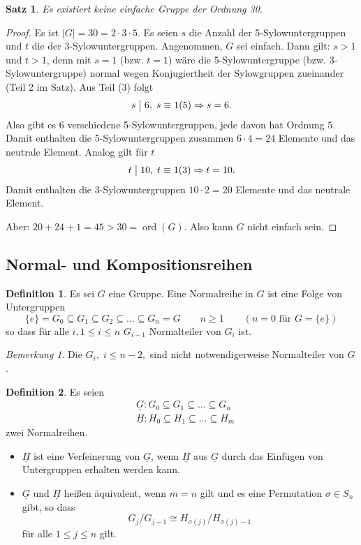 \documentclass[12pt]{scrartcl} %
\DeclareMathOperator{\ord}{ord}
\newcommand{\divides}{\mathrel{\bigm|}}
\newtheorem{thm}{Satz}
\theoremstyle{definition}
\newtheorem*{defn}{Definition}
\theoremstyle{remark}
\newtheorem*{nb}{Bemerkung}
\begin{document}
\begin{thm}
	Es existiert keine einfache Gruppe der Ordnung 30.
\end{thm}

\begin{proof}
	Es ist $|G| = 30 = 2\cdot 3\cdot 5$. Es seien $s$ die Anzahl der 5-Sylowuntergruppen und $t$ die der 3-Sylowuntergruppen. Angenommen, $G$ sei einfach. Dann gilt: $s>1$ und $t>1$, denn mit $s=1$ (bzw. $t=1$) wäre die 5-Sylowuntergruppe (bzw. 3-Sylowuntergruppe) normal wegen Konjugiertheit der Sylowgruppen zueinander (Teil 2 im Satz). Aus Teil (3) folgt
		\[ s \divides 6,\; s\equiv 1(5)\Rightarrow s=6.\]
	Also gibt es 6 verschiedene 5-Sylowuntergruppen, jede davon hat Ordnung $5$. Damit enthalten die 5-Sylowuntergruppen zusammen $6\cdot 4 =24$ Elemente und das neutrale Element. Analog gilt für $t$
		\[ t \divides 10,\; t\equiv 1(3) \Rightarrow t=10.\]
	Damit enthalten die 3-Sylowuntergruppen $10\cdot 2=20$ Elemente und das neutrale Element.
	
	Aber: $20+24+1=45>30=\ord(G)$. Also kann $G$ nicht einfach sein.
\end{proof}

\subsection{Normal- und Kompositionsreihen}

\begin{defn}
	Es sei $G$ eine Gruppe. Eine Normalreihe in $G$ ist eine Folge von Untergruppen
		\[ \{e\} = G_0 \subseteq G_1 \subseteq G_2 \subseteq\dots\subseteq G_n=G\qquad n\geq 1\qquad(n=0\text{ für } G=\{e\})\]
	so dass für alle $i,1\leq i\leq n$ $G_{i-1}$ Normalteiler von $G_i$ ist.
\end{defn}

\begin{nb}
	Die $G_i,\;i\leq n-2,$ sind nicht notwendigerweise Normalteiler von $G$.
\end{nb}

\begin{defn}
	Es seien 
		\[\begin{split}
			&\underline{G}: G_0\subseteq G_1 \subseteq\dots\subseteq G_n \\
			&\underline{H}: H_0\subseteq H_1\subseteq\dots\subseteq H_m 
		\end{split}\]
	zwei Normalreihen.
	\begin{itemize}
		\item $\underline{H}$ ist eine Verfeinerung von $\underline{G}$, wenn $\underline{H}$ aus $\underline{G}$ durch das Einfügen von Untergruppen erhalten werden kann.
		\item $\underline{G}$ und $\underline{H}$ heißen äquivalent, wenn $m=n$ gilt und es eine Permutation $\sigma\in S_n$ gibt, so dass 
		\[ G_j/G_{j-1}\cong H_{\sigma(j)}/H_{\sigma(j)-1}\]
			für alle $1\leq j\leq n$ gilt.
	\end{itemize}
\end{defn}
\end{document}
